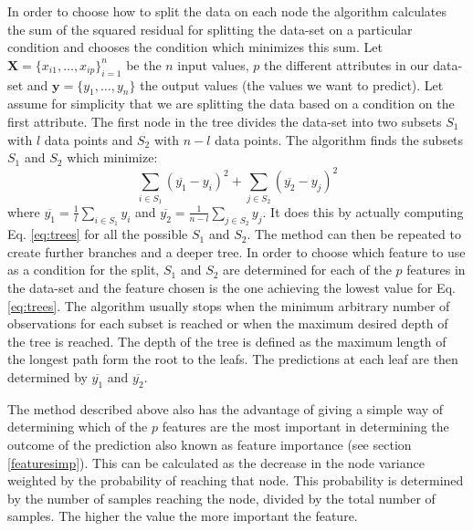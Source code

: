 In order to choose how to split the data on each node the algorithm calculates the sum of the squared residual for splitting the data-set on a particular condition and chooses the condition which minimizes this sum. Let $\bm{X} = \{x_{i1},\ldots ,x_{ip}\}_{i=1}^{n}$ be the $n$ input values, $p$ the different attributes in our data-set and $\mathbf{y} = \{y_{1},\ldots ,y_{n}\}$ the output values (the values we want to predict). Let assume for simplicity that we are splitting the data based on a condition on the first attribute. The first node in the tree divides the data-set into two subsets $S_1$ with $l$ data points and $S_2$ with $n-l$ data points. The algorithm finds the subsets $S_1$ and $S_2$ which minimize:
\begin{equation}\label{eq:trees}
\sum_{i \in S_1}(\overline{y_1}-y_i)^2 + \sum_{j \in S_2}(\overline{y_2}-y_j)^2
\end{equation}
where  $\overline{y_1} = \frac{1}{l}\sum_{i \in S_1}y_i$ and $\overline{y_2} = \frac{1}{n-l}\sum_{j \in S_2}y_j$. It does this by actually computing Eq. \ref{eq:trees} for all the possible $S_1$ and $S_2$. The method can then be repeated to create further branches and a deeper tree. In order to choose which feature to use as a condition for the split, $S_1$ and $S_2$ are determined for each of the $p$ features in the data-set and the feature chosen is the one achieving the lowest value for Eq. \ref{eq:trees}. The algorithm usually stops when the minimum arbitrary number of observations for each subset is reached or when the maximum desired depth of the tree is reached. The depth of the tree is defined as the maximum length of the longest path form the root to the leafs. The predictions at each leaf are then determined by $\overline{y_1}$ and $\overline{y_2}$.

The method described above also has the advantage of giving a simple way of determining which of the $p$ features are the most important in determining the outcome of the prediction also known as feature importance (see section \ref{featuresimp}). This can be calculated as the decrease in the node variance weighted by the probability of reaching that node. This probability is determined by the number of samples reaching the node, divided by the total number of samples. The higher the value the more important the feature. 


